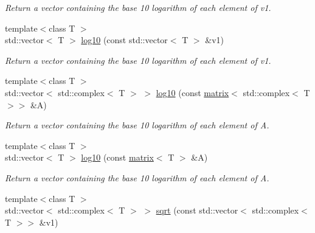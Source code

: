 \begin{DoxyCompactItemize}
\begin{DoxyCompactList}\small\item\em Return a vector containing the base 10 logarithm of each element of v1. \end{DoxyCompactList}\item 
\hypertarget{namespacekeycpp_a3042ac961c7bffb3c315f41f175c5760}{{\footnotesize template$<$class T $>$ }\\std\-::vector$<$ T $>$ \hyperlink{namespacekeycpp_a3042ac961c7bffb3c315f41f175c5760}{log10} (const std\-::vector$<$ T $>$ \&v1)}\label{namespacekeycpp_a3042ac961c7bffb3c315f41f175c5760}

\begin{DoxyCompactList}\small\item\em Return a vector containing the base 10 logarithm of each element of v1. \end{DoxyCompactList}\item 
\hypertarget{namespacekeycpp_a3ea3b5f6f548e122d29e4571e15307fd}{{\footnotesize template$<$class T $>$ }\\std\-::vector$<$ std\-::complex$<$ T $>$ $>$ \hyperlink{namespacekeycpp_a3ea3b5f6f548e122d29e4571e15307fd}{log10} (const \hyperlink{classkeycpp_1_1matrix}{matrix}$<$ std\-::complex$<$ T $>$$>$ \&A)}\label{namespacekeycpp_a3ea3b5f6f548e122d29e4571e15307fd}

\begin{DoxyCompactList}\small\item\em Return a vector containing the base 10 logarithm of each element of A. \end{DoxyCompactList}\item 
\hypertarget{namespacekeycpp_a1b6529b56bdc13937f058879d0f5881d}{{\footnotesize template$<$class T $>$ }\\std\-::vector$<$ T $>$ \hyperlink{namespacekeycpp_a1b6529b56bdc13937f058879d0f5881d}{log10} (const \hyperlink{classkeycpp_1_1matrix}{matrix}$<$ T $>$ \&A)}\label{namespacekeycpp_a1b6529b56bdc13937f058879d0f5881d}

\begin{DoxyCompactList}\small\item\em Return a vector containing the base 10 logarithm of each element of A. \end{DoxyCompactList}\item 
\hypertarget{namespacekeycpp_a24d916a516c57aad0e383ce29a50b963}{{\footnotesize template$<$class T $>$ }\\std\-::vector$<$ std\-::complex$<$ T $>$ $>$ \hyperlink{namespacekeycpp_a24d916a516c57aad0e383ce29a50b963}{sqrt} (const std\-::vector$<$ std\-::complex$<$ T $>$$>$ \&v1)}\label{namespacekeycpp_a24d916a516c57aad0e383ce29a50b963}


\end{DoxyCompactItemize}
